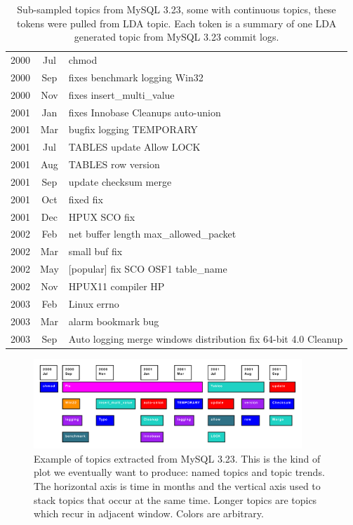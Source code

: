 \documentclass[times, 10pt,twocolumn]{article}
\begin{document}
\begin{table}
\centering
\begin{tabular}{|cc|l|}
\hline
2000 &  Jul &      chmod \\
2000 &  Sep &      fixes benchmark logging Win32 \\
2000 &  Nov &      fixes insert\_multi\_value \\
2001 &  Jan &      fixes Innobase Cleanups auto-union \\
2001 &  Mar &      bugfix logging  TEMPORARY  \\
\hline         
2001 &  Jul &      TABLES update Allow LOCK \\ 
               
2001 &  Aug &      TABLES row version \\
\hline         
2001 &  Sep &      update checksum merge \\
2001 &  Oct &      fixed fix \\
2001 &  Dec &      HPUX SCO fix \\
\hline         
2002 &  Feb &      net buffer length  max\_allowed\_packet \\
2002 &  Mar &      small buf fix  \\
\hline         
2002 &  May &      [popular] fix SCO OSF1 table\_name \\
2002 &  Nov &      HPUX11 compiler HP \\
\hline         
2003 &  Feb &      Linux errno   \\
2003 &  Mar &      alarm bookmark bug \\
\hline         
2003 &  Sep &      Auto logging merge windows distribution fix 64-bit 4.0 Cleanup \\
\hline
\end{tabular}
\caption{Sub-sampled topics from MySQL 3.23, some with continuous topics, these tokens were pulled from LDA topic. Each token is a summary of one LDA generated topic from MySQL 3.23 commit logs.}
\label{tab:portability}
\end{table}



\begin{figure}
  \centering
  \includegraphics[width=0.9\textwidth]{lda}
  \caption{Example of topics extracted from MySQL 3.23. This is the kind of plot we eventually want to produce: named topics and topic trends. The horizontal axis is time in months and the vertical axis used to stack topics that occur at the same time. Longer topics are topics which recur in adjacent window. Colors are arbitrary.}
  \label{fig:lda}
\end{figure}
\end{document}
